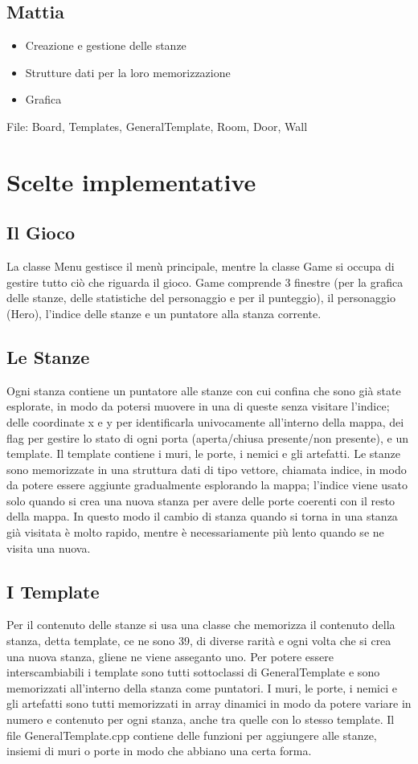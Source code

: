 \documentclass[12pt]{article}
\begin{document}
\subsection*{Mattia}
\begin{itemize}
    \item Creazione e gestione delle stanze 
    \item Strutture dati per la loro memorizzazione
    \item Grafica
\end{itemize}
File: Board, Templates, GeneralTemplate, Room, Door, Wall

\newpage
\section*{Scelte implementative}
\subsection*{Il Gioco}
La classe Menu gestisce il menù principale, mentre la classe Game si occupa di gestire tutto ciò che riguarda il gioco.
Game comprende 3 finestre (per la grafica delle stanze, delle statistiche del personaggio e per il punteggio), il personaggio (Hero), l'indice delle stanze e un puntatore alla stanza corrente.

\subsection*{Le Stanze}
Ogni stanza contiene un puntatore alle stanze con cui confina che sono già state esplorate, in modo da potersi muovere in una di queste senza visitare l'indice; delle coordinate x e y per identificarla univocamente all'interno della mappa, dei flag per gestire lo stato di ogni porta (aperta/chiusa presente/non presente), e un template. Il template contiene i muri, le porte, i nemici e gli artefatti.
Le stanze sono memorizzate in una struttura dati di tipo vettore, chiamata indice, in modo da potere essere aggiunte gradualmente esplorando la mappa; l'indice viene usato solo quando si crea una nuova stanza per avere delle porte coerenti con il resto della mappa.
In questo modo il cambio di stanza quando si torna in una stanza già visitata è molto rapido, mentre è necessariamente più lento quando se ne visita una nuova. 

\subsection*{I Template}
Per il contenuto delle stanze si usa una classe che memorizza il contenuto della stanza, detta template, ce ne sono 39, di diverse rarità e ogni volta che si crea una nuova stanza, gliene ne viene asseganto uno.
Per potere essere interscambiabili i template sono tutti sottoclassi di GeneralTemplate e sono memorizzati all'interno della stanza come puntatori.
I muri, le porte, i nemici e gli artefatti sono tutti memorizzati in array dinamici in modo da potere variare in numero e contenuto per ogni stanza, anche tra quelle con lo stesso template.
Il file GeneralTemplate.cpp contiene delle funzioni per aggiungere alle stanze, insiemi di muri o porte in modo che abbiano una certa forma.
\end{document}
